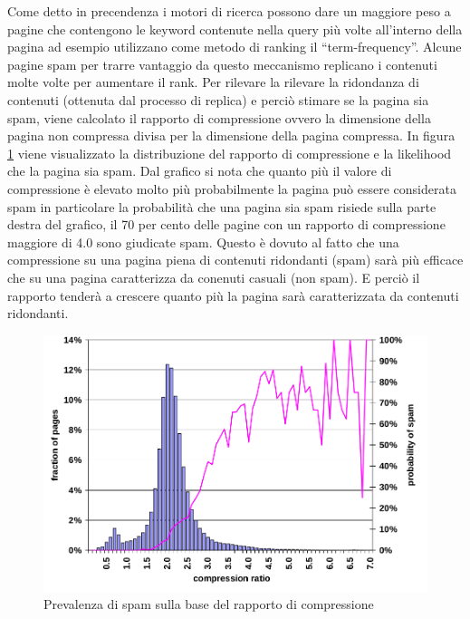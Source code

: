 Come detto in precendenza i  motori di ricerca possono dare un maggiore peso a pagine che contengono le keyword contenute nella query più volte all'interno della pagina ad esempio utilizzano come metodo di ranking il ``term-frequency''. Alcune pagine spam per trarre vantaggio da questo meccanismo replicano i contenuti molte volte per aumentare il rank. Per rilevare la rilevare la ridondanza di contenuti (ottenuta dal processo di replica) e perciò stimare se la pagina sia spam, viene calcolato il rapporto di compressione ovvero la dimensione della pagina non compressa divisa per la dimensione della pagina compressa. In figura \ref{fig:fetterly8} viene visualizzato la distribuzione del rapporto di compressione e la likelihood che la pagina sia spam. Dal grafico si nota che quanto più il valore di compressione è elevato molto più probabilmente la pagina può essere considerata spam in particolare  la probabilità che una pagina sia spam risiede sulla parte destra del grafico, il 70 per cento delle pagine con un 
rapporto di compressione maggiore di 4.0 sono giudicate spam. Questo è dovuto al fatto che una compressione su una pagina piena di contenuti ridondanti (spam) sarà più efficace che su una pagina caratterizza da conenuti casuali (non spam). E perciò il rapporto tenderà a crescere quanto più la pagina sarà caratterizzata da contenuti ridondanti.
\begin{figure}[htbp]
\centering
\includegraphics[width=12cm]{immagini/fetterly/fetterly8}
\caption{Prevalenza di spam sulla base del rapporto di compressione}
\label{fig:fetterly8}
\end{figure}

